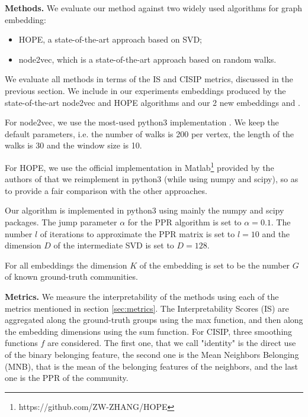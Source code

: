 \noindent\textbf{Methods.} 
We evaluate our method against two widely used algorithms for graph embedding:
\begin{itemize}
\item HOPE, a state-of-the-art approach based on SVD;
\item node2vec, which is a state-of-the-art approach based on random walks.
\end{itemize}

We evaluate all methods in terms of the IS and CISIP metrics, discussed in the previous section. 
We include in our experiments embeddings produced by the state-of-the-art node2vec and HOPE algorithms and our 2 new embeddings \newembLeft and \newembRight.


For node2vec, we use the most-used python3 implementation \cite{node2vec_impl}. We keep the default parameters, i.e. the number of walks is 200 per vertex, the length of the walks is 30 and the window size is 10.

For HOPE, we use the official implementation in Matlab\footnote{https://github.com/ZW-ZHANG/HOPE} provided by the authors of \cite{HOPE} that we reimplement in python3 (while using numpy and scipy), so as to provide a fair comparison with the other approaches. %

Our algorithm is implemented in python3 using mainly the numpy \cite{numpy} and scipy \cite{scipy} packages. The jump parameter $\alpha$ for the PPR algorithm is set to $\alpha=0.1$. The number $l$ of iterations to approximate the PPR matrix is set to $l=10$ and the dimension $D$ of the intermediate SVD is set to $D=128$.

For all embeddings %
the dimension $K$ of the embedding is set to be the number $G$ of known ground-truth communities.

\noindent\textbf{Metrics.} We measure the interpretability of the methods using each of the metrics mentioned in section \ref{sec:metrics}. The Interpretability Scores (IS) are aggregated along the ground-truth groups using the max function, and then along the embedding dimensions using the sum function.
For CISIP, three smoothing functions $f$ are considered. The first one, that we call "identity" is the direct use of the binary belonging feature, the second one is the Mean Neighbors Belonging (MNB), that is the mean of the belonging features of the neighbors, and the last one is the PPR of the community.

